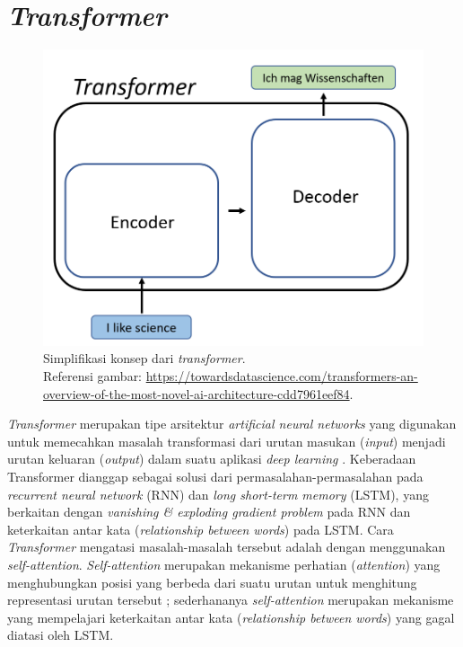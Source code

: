 \section{\emph{Transformer}}

\begin{figure}[h]
\includegraphics[scale=0.5]{assets/pics/transformers.png}
\centering
\caption{Simplifikasi konsep dari \emph{transformer}.\\\hspace{\textwidth}Referensi gambar: \url{https://towardsdatascience.com/transformers-an-overview-of-the-most-novel-ai-architecture-cdd7961eef84}.}
\end{figure}

\emph{Transformer} merupakan tipe arsitektur \emph{artificial neural networks} yang digunakan untuk memecahkan masalah transformasi dari urutan masukan (\emph{input}) menjadi urutan keluaran (\emph{output}) dalam suatu aplikasi \emph{deep learning} \citep{transformers-self-attention-to-the-rescue}. Keberadaan Transformer dianggap sebagai solusi dari permasalahan-permasalahan pada \emph{recurrent neural network} (RNN) dan \emph{long short-term memory} (LSTM), yang berkaitan dengan \emph{vanishing \& exploding gradient problem} pada RNN dan keterkaitan antar kata (\emph{relationship between words}) pada LSTM. Cara \emph{Transformer} mengatasi masalah-masalah tersebut adalah dengan menggunakan \emph{self-attention}. \emph{Self-attention} merupakan mekanisme perhatian (\emph{attention}) yang menghubungkan posisi yang berbeda dari suatu urutan untuk menghitung representasi urutan tersebut \citep{DBLP:journals/corr/VaswaniSPUJGKP17}; sederhananya \emph{self-attention} merupakan mekanisme yang mempelajari keterkaitan antar kata (\emph{relationship between words}) yang gagal diatasi oleh LSTM. 

